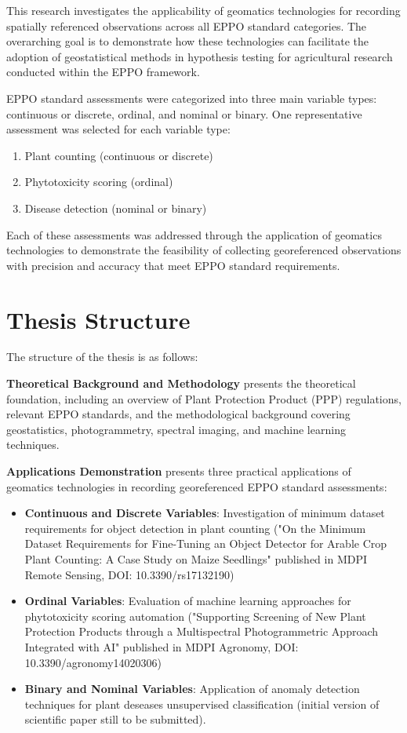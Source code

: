 \documentclass[12pt,a4paper,oneside]{report}
\begin{document}
This research investigates the applicability of geomatics technologies for 
recording spatially referenced observations across all EPPO standard categories. 
The overarching goal is to demonstrate how these technologies can facilitate the 
adoption of geostatistical methods in hypothesis testing for agricultural 
research conducted within the EPPO framework.

EPPO standard assessments were categorized into three main variable types: 
continuous or discrete, ordinal, and nominal or binary. One representative 
assessment was selected for each variable type:

\begin{enumerate}
\item Plant counting (continuous or discrete)
\item Phytotoxicity scoring (ordinal)
\item Disease detection (nominal or binary)
\end{enumerate}

Each of these assessments was addressed through the application of geomatics 
technologies to demonstrate the feasibility of collecting georeferenced 
observations with precision and accuracy that meet EPPO standard requirements.

\section{Thesis Structure}

The structure of the thesis is as follows:

\textbf{Theoretical Background and Methodology} presents the theoretical 
foundation, including an overview of Plant Protection Product (PPP) regulations, 
relevant EPPO standards, and the methodological background covering geostatistics, 
photogrammetry, spectral imaging, and machine learning techniques.

\textbf{Applications Demonstration} presents three practical applications of 
geomatics technologies in recording georeferenced EPPO standard assessments:
\begin{itemize}
    \item \textbf{Continuous and Discrete Variables}: Investigation of minimum 
    dataset requirements for object detection in plant counting ("On the Minimum 
    Dataset Requirements for Fine-Tuning an
    Object Detector for Arable Crop Plant Counting: A Case Study on Maize 
    Seedlings" published in MDPI Remote Sensing, DOI: 10.3390/rs17132190)
    \item \textbf{Ordinal Variables}: Evaluation of machine learning approaches 
    for phytotoxicity scoring automation ("Supporting Screening of New Plant 
    Protection Products through a Multispectral Photogrammetric Approach 
    Integrated with AI" published in MDPI Agronomy, 
    DOI: 10.3390/agronomy14020306)  
    \item \textbf{Binary and Nominal Variables}: Application of anomaly 
    detection techniques for plant deseases unsupervised classification 
    (initial version of scientific paper still to be submitted). 
\end{itemize}
\end{document}
